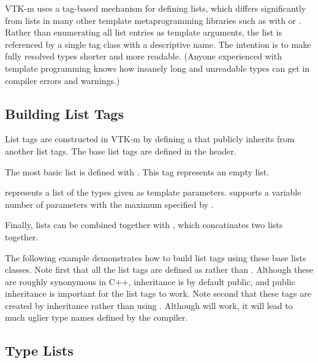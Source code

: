 VTK-m uses a tag-based mechanism for defining lists, which differs
significantly from lists in many other template metaprogramming libraries
such as with  or
. Rather than enumerating all list
entries as template arguments, the list is referenced by a single tag class
with a descriptive name. The intention is to make fully resolved types
shorter and more readable. (Anyone experienced with template programming
knows how insanely long and unreadable types can get in compiler errors and
warnings.)

\subsection{Building List Tags}
\label{sec:BuildingListTags}

List tags are constructed in VTK-m by defining a  that
publicly inherits from another list tags. The base list tags are defined in
the  header.

The most basic list is defined with . This tag
represents an empty list.

 represents a list of the types given as
template parameters.  supports a variable number of
parameters with the maximum specified by .

Finally, lists can be combined together with
, which concatinates two lists
together.

The following example demonstrates how to build list tags using these base
lists classes. Note first that all the list tags are defined as
 rather than . Although these are roughly
synonymous in C++,  inheritance is by default public, and
public inheritance is important for the list tags to work. Note second that
these tags are created by inheritance rather than using
. Although  will work, it will lead to
much uglier type names defined by the compiler.


\subsection{Type Lists}
\label{sec:TypeLists}


